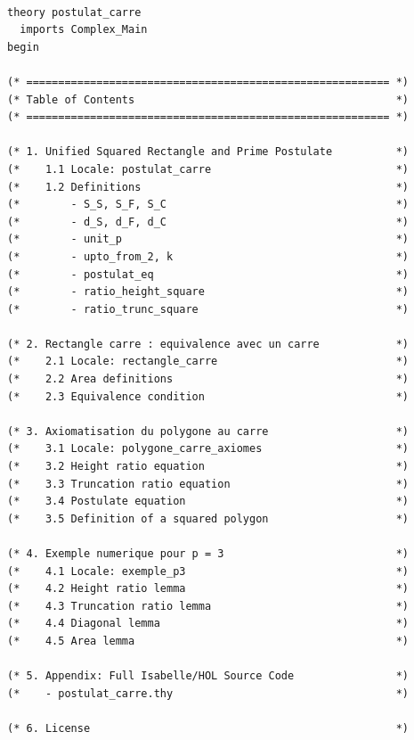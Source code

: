 \documentclass[12pt,a4paper]{article}
\begin{document}
\begin{verbatim}

theory postulat_carre
  imports Complex_Main
begin

(* ========================================================= *)
(* Table of Contents                                         *)
(* ========================================================= *)

(* 1. Unified Squared Rectangle and Prime Postulate          *)
(*    1.1 Locale: postulat_carre                             *)
(*    1.2 Definitions                                        *)
(*        - S_S, S_F, S_C                                    *)
(*        - d_S, d_F, d_C                                    *)
(*        - unit_p                                           *)
(*        - upto_from_2, k                                   *)
(*        - postulat_eq                                      *)
(*        - ratio_height_square                              *)
(*        - ratio_trunc_square                               *)

(* 2. Rectangle carre : equivalence avec un carre            *)
(*    2.1 Locale: rectangle_carre                            *)
(*    2.2 Area definitions                                   *)
(*    2.3 Equivalence condition                              *)

(* 3. Axiomatisation du polygone au carre                    *)
(*    3.1 Locale: polygone_carre_axiomes                     *)
(*    3.2 Height ratio equation                              *)
(*    3.3 Truncation ratio equation                          *)
(*    3.4 Postulate equation                                 *)
(*    3.5 Definition of a squared polygon                    *)

(* 4. Exemple numerique pour p = 3                           *)
(*    4.1 Locale: exemple_p3                                 *)
(*    4.2 Height ratio lemma                                 *)
(*    4.3 Truncation ratio lemma                             *)
(*    4.4 Diagonal lemma                                     *)
(*    4.5 Area lemma                                         *)

(* 5. Appendix: Full Isabelle/HOL Source Code                *)
(*    - postulat_carre.thy                                   *)

(* 6. License                                                *)


\end{verbatim}
\end{document}
